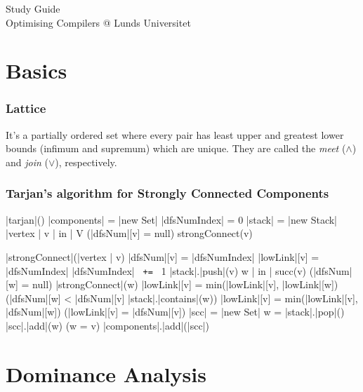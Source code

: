 \documentclass[a4paper,12pt, notitlepage]{article}
\newcommand{\negv}{\vspace{-0.7cm}}
\begin{document}
\begin{center}

{\Large{Study Guide\\ \bigskip
			Optimising Compilers @ Lunds Universitet}}
\vspace{1cm}
\end{center}
\section*{Basics}
\subsubsection*{Lattice}
It's a partially ordered set where every pair has least upper and greatest lower
bounds (infimum and supremum) which are unique. They are called the
\textit{meet} ($\land$) and \textit{join} ($\lor$), respectively.

\subsubsection*{Tarjan's algorithm for Strongly Connected Components}
\negv
\begin{program}
\PROC |tarjan|() \BODY
    |components| = |new Set|
    |dfsNumIndex| = 0
    |stack| = |new Stack|
    \FOREACH |vertex | v | in | V \DO
        \IF (|dfsNum|[v] = null) \AR*
            strongConnect(v)
        \FI \OD
\end{program} \negv
\begin{program}
\PROC |strongConnect|(|vertex | v) \BODY
    |dfsNum|[v] = |dfsNumIndex|
    |lowLink|[v] = |dfsNumIndex|
    |dfsNumIndex| \texttt{ += } 1
    |stack|.|push|(v)
    \FOREACH w | in | succ(v) \DO
        \IF (|dfsNum|[w] = null) \AR*
            |strongConnect|(w)
            |lowLink|[v] = min(|lowLink|[v], |lowLink|[w])
        \ELSIF (|dfsNum|[w] < |dfsNum|[v] \land |stack|.|contains|(w)) \AR*
            |lowLink|[v] = min(|lowLink|[v], |dfsNum|[w]) \FI
    \OD
    \IF (|lowLink|[v] = |dfsNum|[v]) \AR*
        |scc| = |new Set|
        \DOW
            w = |stack|.|pop|()
            |scc|.|add|(w)
        \ODW (w \not= v)
        |components|.|add|(|scc|)
    \FI
\end{program}
\section*{Dominance Analysis}
\end{document}
